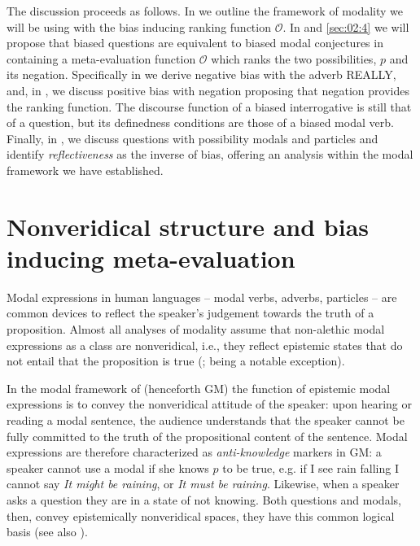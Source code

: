 \documentclass[output=paper,colorlinks,citecolor=brown]{langscibook}
\begin{document}
The discussion proceeds as follows.  In  we outline  the framework of modality we will be using with the bias  inducing ranking function $\mathcal{O}$. In  and \ref{sec:02:4} we will propose that biased questions are equivalent to biased modal conjectures in containing a meta-evaluation function $\mathcal{O}$ which ranks the two possibilities, $p$ and its negation. Specifically in  we derive negative bias with the adverb \textsc{REALLY}, and, in , we discuss positive bias with negation proposing that negation provides the ranking function. The discourse function of a biased interrogative is still that of a question, but its definedness conditions are those of a biased modal verb. Finally, in , we discuss questions with possibility modals and particles
and identify \textit{reflectiveness} as the inverse of bias, offering an analysis within the modal framework we have established. 


 \section{Nonveridical structure and bias inducing meta-evaluation} \label{sec:02:2}

Modal expressions in human languages --  modal verbs, adverbs, particles --  are common devices to reflect the speaker's judgement towards the truth of a proposition. Almost all analyses of modality assume that non-alethic modal expressions as a class are nonveridical, i.e., they reflect epistemic states that do not entail that the proposition is true (\citealt{kratzer1977, kratzer1986, kratzer1991, giannakidou1997, giannakidou1998, giannakidou1999, giannakidou2013, condoravdi2002, portner2009, Beaver2016, giannakidoumari2016, giannakidoumari2018b, giannakidoumari2021a, giannakidoumari2021b, lassiter2016}; \citealt{von2010} being a notable exception).

In the modal framework of \citet{giannakidoumari2016, giannakidoumari2018b, giannakidoumari2021a, giannakidoumari2021b} (henceforth GM)  the function of epistemic modal expressions is to convey the nonveridical attitude of the speaker: upon hearing or reading a modal sentence, the audience understands that the speaker cannot be fully committed to the truth of the propositional content of the sentence. Modal expressions are therefore characterized as \textit{anti-knowledge} markers in GM: a speaker cannot use a modal if she knows $p$ to be true, e.g. if I see rain falling I cannot say \textit{It might be raining}, or \textit{It must be raining}.   Likewise, when a speaker asks a  question they are in a state of not knowing. Both questions and modals, then,  convey epistemically nonveridical spaces, they have this common logical basis (see also \citealt{sherman2018}). 
\end{document}
